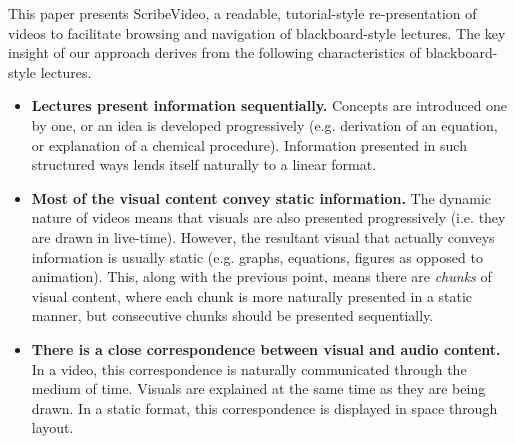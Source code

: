 This paper presents ScribeVideo, a readable, tutorial-style re-presentation of videos to facilitate browsing and navigation of blackboard-style lectures.  The key insight of our approach derives from the following characteristics of blackboard-style lectures. 
\begin{itemize}
\item \textbf{Lectures present information sequentially.} Concepts are introduced one by one, or an idea is developed progressively (e.g. derivation of an equation, or explanation of a chemical procedure). Information presented in such structured ways lends itself naturally to a linear format.
\item \textbf{Most of the visual content convey static information.} The dynamic nature of videos means that visuals are also presented progressively (i.e. they are drawn in live-time). However, the resultant visual that actually conveys information is usually static (e.g. graphs, equations, figures as opposed to animation). This, along with the previous point, means there are \textit{chunks} of visual content, where each chunk is more naturally presented in a static manner, but consecutive chunks should be presented sequentially.
\item \textbf{There is a close correspondence between visual and audio content.} In a video, this correspondence is naturally communicated through the medium of time. Visuals are explained at the same time as they are being drawn. In a static format, this correspondence is displayed in space through layout.
\end{itemize}


